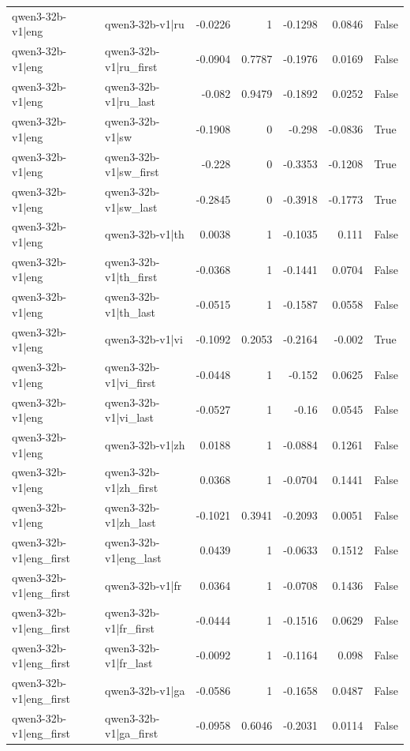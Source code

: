 \begin{table}
\begin{tabular}{l l r r r r l}
qwen3-32b-v1|eng & qwen3-32b-v1|ru & -0.0226 & 1 & -0.1298 & 0.0846 & False \\
qwen3-32b-v1|eng & qwen3-32b-v1|ru_first & -0.0904 & 0.7787 & -0.1976 & 0.0169 & False \\
qwen3-32b-v1|eng & qwen3-32b-v1|ru_last & -0.082 & 0.9479 & -0.1892 & 0.0252 & False \\
qwen3-32b-v1|eng & qwen3-32b-v1|sw & -0.1908 & 0 & -0.298 & -0.0836 & True \\
qwen3-32b-v1|eng & qwen3-32b-v1|sw_first & -0.228 & 0 & -0.3353 & -0.1208 & True \\
qwen3-32b-v1|eng & qwen3-32b-v1|sw_last & -0.2845 & 0 & -0.3918 & -0.1773 & True \\
qwen3-32b-v1|eng & qwen3-32b-v1|th & 0.0038 & 1 & -0.1035 & 0.111 & False \\
qwen3-32b-v1|eng & qwen3-32b-v1|th_first & -0.0368 & 1 & -0.1441 & 0.0704 & False \\
qwen3-32b-v1|eng & qwen3-32b-v1|th_last & -0.0515 & 1 & -0.1587 & 0.0558 & False \\
qwen3-32b-v1|eng & qwen3-32b-v1|vi & -0.1092 & 0.2053 & -0.2164 & -0.002 & True \\
qwen3-32b-v1|eng & qwen3-32b-v1|vi_first & -0.0448 & 1 & -0.152 & 0.0625 & False \\
qwen3-32b-v1|eng & qwen3-32b-v1|vi_last & -0.0527 & 1 & -0.16 & 0.0545 & False \\
qwen3-32b-v1|eng & qwen3-32b-v1|zh & 0.0188 & 1 & -0.0884 & 0.1261 & False \\
qwen3-32b-v1|eng & qwen3-32b-v1|zh_first & 0.0368 & 1 & -0.0704 & 0.1441 & False \\
qwen3-32b-v1|eng & qwen3-32b-v1|zh_last & -0.1021 & 0.3941 & -0.2093 & 0.0051 & False \\
qwen3-32b-v1|eng_first & qwen3-32b-v1|eng_last & 0.0439 & 1 & -0.0633 & 0.1512 & False \\
qwen3-32b-v1|eng_first & qwen3-32b-v1|fr & 0.0364 & 1 & -0.0708 & 0.1436 & False \\
qwen3-32b-v1|eng_first & qwen3-32b-v1|fr_first & -0.0444 & 1 & -0.1516 & 0.0629 & False \\
qwen3-32b-v1|eng_first & qwen3-32b-v1|fr_last & -0.0092 & 1 & -0.1164 & 0.098 & False \\
qwen3-32b-v1|eng_first & qwen3-32b-v1|ga & -0.0586 & 1 & -0.1658 & 0.0487 & False \\
qwen3-32b-v1|eng_first & qwen3-32b-v1|ga_first & -0.0958 & 0.6046 & -0.2031 & 0.0114 & False \\

\end{tabular}
\end{table}
